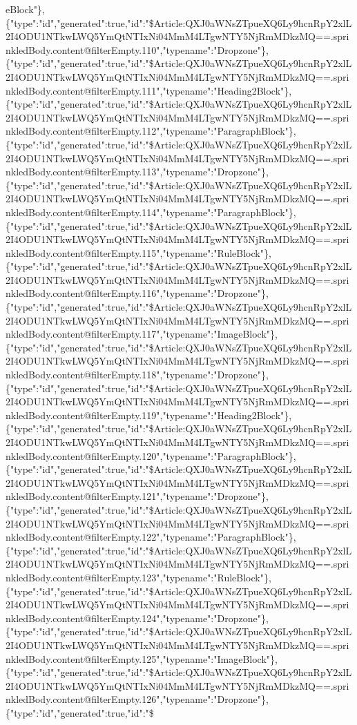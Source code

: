 eBlock"\},\{"type":"id","generated":true,"id":"\$Article:QXJ0aWNsZTpueXQ6Ly9hcnRpY2xlL2I4ODU1NTkwLWQ5YmQtNTIxNi04MmM4LTgwNTY5NjRmMDkzMQ==.sprinkledBody.content@filterEmpty.110","typename":"Dropzone"\},\{"type":"id","generated":true,"id":"\$Article:QXJ0aWNsZTpueXQ6Ly9hcnRpY2xlL2I4ODU1NTkwLWQ5YmQtNTIxNi04MmM4LTgwNTY5NjRmMDkzMQ==.sprinkledBody.content@filterEmpty.111","typename":"Heading2Block"\},\{"type":"id","generated":true,"id":"\$Article:QXJ0aWNsZTpueXQ6Ly9hcnRpY2xlL2I4ODU1NTkwLWQ5YmQtNTIxNi04MmM4LTgwNTY5NjRmMDkzMQ==.sprinkledBody.content@filterEmpty.112","typename":"ParagraphBlock"\},\{"type":"id","generated":true,"id":"\$Article:QXJ0aWNsZTpueXQ6Ly9hcnRpY2xlL2I4ODU1NTkwLWQ5YmQtNTIxNi04MmM4LTgwNTY5NjRmMDkzMQ==.sprinkledBody.content@filterEmpty.113","typename":"Dropzone"\},\{"type":"id","generated":true,"id":"\$Article:QXJ0aWNsZTpueXQ6Ly9hcnRpY2xlL2I4ODU1NTkwLWQ5YmQtNTIxNi04MmM4LTgwNTY5NjRmMDkzMQ==.sprinkledBody.content@filterEmpty.114","typename":"ParagraphBlock"\},\{"type":"id","generated":true,"id":"\$Article:QXJ0aWNsZTpueXQ6Ly9hcnRpY2xlL2I4ODU1NTkwLWQ5YmQtNTIxNi04MmM4LTgwNTY5NjRmMDkzMQ==.sprinkledBody.content@filterEmpty.115","typename":"RuleBlock"\},\{"type":"id","generated":true,"id":"\$Article:QXJ0aWNsZTpueXQ6Ly9hcnRpY2xlL2I4ODU1NTkwLWQ5YmQtNTIxNi04MmM4LTgwNTY5NjRmMDkzMQ==.sprinkledBody.content@filterEmpty.116","typename":"Dropzone"\},\{"type":"id","generated":true,"id":"\$Article:QXJ0aWNsZTpueXQ6Ly9hcnRpY2xlL2I4ODU1NTkwLWQ5YmQtNTIxNi04MmM4LTgwNTY5NjRmMDkzMQ==.sprinkledBody.content@filterEmpty.117","typename":"ImageBlock"\},\{"type":"id","generated":true,"id":"\$Article:QXJ0aWNsZTpueXQ6Ly9hcnRpY2xlL2I4ODU1NTkwLWQ5YmQtNTIxNi04MmM4LTgwNTY5NjRmMDkzMQ==.sprinkledBody.content@filterEmpty.118","typename":"Dropzone"\},\{"type":"id","generated":true,"id":"\$Article:QXJ0aWNsZTpueXQ6Ly9hcnRpY2xlL2I4ODU1NTkwLWQ5YmQtNTIxNi04MmM4LTgwNTY5NjRmMDkzMQ==.sprinkledBody.content@filterEmpty.119","typename":"Heading2Block"\},\{"type":"id","generated":true,"id":"\$Article:QXJ0aWNsZTpueXQ6Ly9hcnRpY2xlL2I4ODU1NTkwLWQ5YmQtNTIxNi04MmM4LTgwNTY5NjRmMDkzMQ==.sprinkledBody.content@filterEmpty.120","typename":"ParagraphBlock"\},\{"type":"id","generated":true,"id":"\$Article:QXJ0aWNsZTpueXQ6Ly9hcnRpY2xlL2I4ODU1NTkwLWQ5YmQtNTIxNi04MmM4LTgwNTY5NjRmMDkzMQ==.sprinkledBody.content@filterEmpty.121","typename":"Dropzone"\},\{"type":"id","generated":true,"id":"\$Article:QXJ0aWNsZTpueXQ6Ly9hcnRpY2xlL2I4ODU1NTkwLWQ5YmQtNTIxNi04MmM4LTgwNTY5NjRmMDkzMQ==.sprinkledBody.content@filterEmpty.122","typename":"ParagraphBlock"\},\{"type":"id","generated":true,"id":"\$Article:QXJ0aWNsZTpueXQ6Ly9hcnRpY2xlL2I4ODU1NTkwLWQ5YmQtNTIxNi04MmM4LTgwNTY5NjRmMDkzMQ==.sprinkledBody.content@filterEmpty.123","typename":"RuleBlock"\},\{"type":"id","generated":true,"id":"\$Article:QXJ0aWNsZTpueXQ6Ly9hcnRpY2xlL2I4ODU1NTkwLWQ5YmQtNTIxNi04MmM4LTgwNTY5NjRmMDkzMQ==.sprinkledBody.content@filterEmpty.124","typename":"Dropzone"\},\{"type":"id","generated":true,"id":"\$Article:QXJ0aWNsZTpueXQ6Ly9hcnRpY2xlL2I4ODU1NTkwLWQ5YmQtNTIxNi04MmM4LTgwNTY5NjRmMDkzMQ==.sprinkledBody.content@filterEmpty.125","typename":"ImageBlock"\},\{"type":"id","generated":true,"id":"\$Article:QXJ0aWNsZTpueXQ6Ly9hcnRpY2xlL2I4ODU1NTkwLWQ5YmQtNTIxNi04MmM4LTgwNTY5NjRmMDkzMQ==.sprinkledBody.content@filterEmpty.126","typename":"Dropzone"\},\{"type":"id","generated":true,"id":"\$